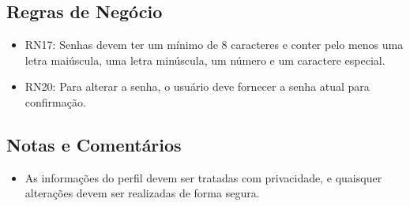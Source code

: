 \subsection*{Regras de Negócio}
\begin{addmargin}[1.5cm]{0cm}
	\begin{itemize}
		\item RN17: Senhas devem ter um mínimo de 8 caracteres e conter pelo menos uma letra maiúscula, uma letra minúscula, um número e um caractere especial.
		\item RN20: Para alterar a senha, o usuário deve fornecer a senha atual para confirmação.
	\end{itemize}
\end{addmargin}

\subsection*{Notas e Comentários}
\begin{addmargin}[1.5cm]{0cm}
	\begin{itemize}
		\item As informações do perfil devem ser tratadas com privacidade, e quaisquer alterações devem ser realizadas de forma segura.
	\end{itemize}
\end{addmargin}
